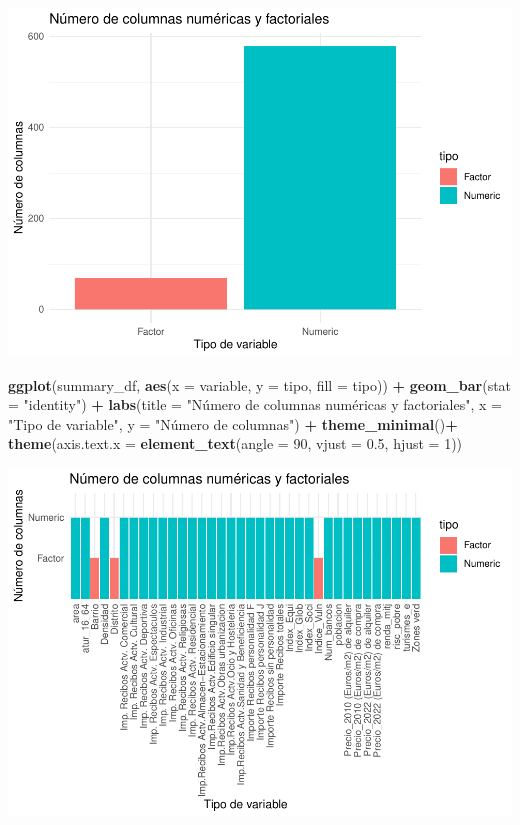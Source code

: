 \documentclass[notspecified,article,submit,moreauthors,pdftex]{Definitions/mdpi}
\newenvironment{Shaded}{\begin{snugshade}}{\end{snugshade}}
\newcommand{\AttributeTok}[1]{\textcolor[rgb]{0.13,0.29,0.53}{#1}}
\newcommand{\DecValTok}[1]{\textcolor[rgb]{0.00,0.00,0.81}{#1}}
\newcommand{\FloatTok}[1]{\textcolor[rgb]{0.00,0.00,0.81}{#1}}
\newcommand{\FunctionTok}[1]{\textcolor[rgb]{0.13,0.29,0.53}{\textbf{#1}}}
\newcommand{\NormalTok}[1]{#1}
\newcommand{\SpecialCharTok}[1]{\textcolor[rgb]{0.81,0.36,0.00}{\textbf{#1}}}
\newcommand{\StringTok}[1]{\textcolor[rgb]{0.31,0.60,0.02}{#1}}
\begin{document}
\begin{center}\includegraphics{./figure/unnamed-chunk-14-1} \end{center}

\begin{Shaded}
\begin{Highlighting}[]
\FunctionTok{ggplot}\NormalTok{(summary\_df, }\FunctionTok{aes}\NormalTok{(}\AttributeTok{x =}\NormalTok{ variable, }\AttributeTok{y =}\NormalTok{ tipo, }\AttributeTok{fill =}\NormalTok{ tipo)) }\SpecialCharTok{+}
  \FunctionTok{geom\_bar}\NormalTok{(}\AttributeTok{stat =} \StringTok{"identity"}\NormalTok{) }\SpecialCharTok{+}
  \FunctionTok{labs}\NormalTok{(}\AttributeTok{title =} \StringTok{"Número de columnas numéricas y factoriales"}\NormalTok{,}
       \AttributeTok{x =} \StringTok{"Tipo de variable"}\NormalTok{,}
       \AttributeTok{y =} \StringTok{"Número de columnas"}\NormalTok{) }\SpecialCharTok{+}
  \FunctionTok{theme\_minimal}\NormalTok{()}\SpecialCharTok{+}
  \FunctionTok{theme}\NormalTok{(}\AttributeTok{axis.text.x =} \FunctionTok{element\_text}\NormalTok{(}\AttributeTok{angle =} \DecValTok{90}\NormalTok{, }\AttributeTok{vjust =} \FloatTok{0.5}\NormalTok{, }\AttributeTok{hjust =} \DecValTok{1}\NormalTok{))}
\end{Highlighting}
\end{Shaded}

\begin{center}\includegraphics{./figure/unnamed-chunk-14-2} \end{center}
\end{document}
